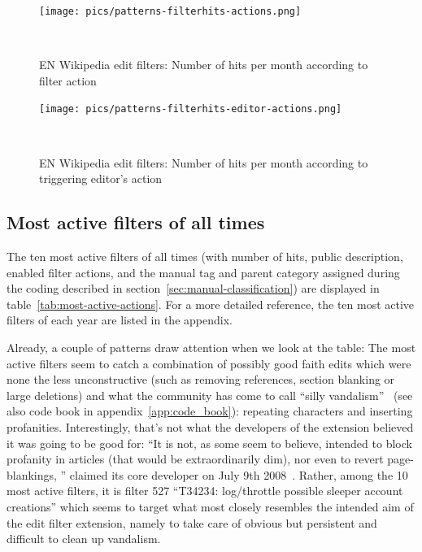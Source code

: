 \begin{figure}
\centering
  \texttt{[image: pics/patterns-filterhits-actions.png]}
  \caption{EN Wikipedia edit filters: Number of hits per month according to filter action}~\label{fig:filter-hits-actions}
\end{figure}

\begin{figure}
\centering
  \texttt{[image: pics/patterns-filterhits-editor-actions.png]}
  \caption{EN Wikipedia edit filters: Number of hits per month according to triggering editor's action}~\label{fig:filter-hits-editors-actions}
\end{figure}

\subsection{Most active filters of all times}
\label{sec:most-active-all-times}

The ten most active filters of all times (with number of hits, public description, enabled filter actions, and the manual tag and parent category assigned during the coding described in section~\ref{sec:manual-classification}) are displayed in table~\ref{tab:most-active-actions}.
For a more detailed reference, the ten most active filters of each year are listed in the appendix. %

Already, a couple of patterns draw attention when we look at the table:
The most active filters seem to catch a combination of possibly good faith edits which were none the less unconstructive (such as removing references, section blanking or large deletions)
and what the community has come to call ``silly vandalism''~\cite{Wikipedia:VandalismTypes} (see also code book in appendix~\ref{app:code_book}): repeating characters and inserting profanities.
Interestingly, that's not what the developers of the extension believed it was going to be good for:
``It is not, as some seem to believe, intended to block profanity in articles (that would be extraordinarily dim), nor even to revert page-blankings, '' claimed its core developer on July 9th 2008~\cite{Wikipedia:EditFilterTalkArchive1Clarification}.
Rather, among the 10 most active filters, it is filter 527 ``T34234: log/throttle possible sleeper account creations'' which seems to target what most closely resembles the intended aim of the edit filter extension, namely to take care of obvious but persistent and difficult to clean up vandalism.

